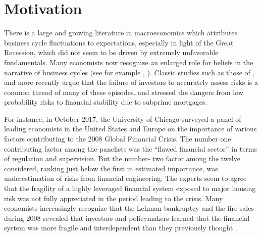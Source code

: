 \documentclass[12pt]{article}
\newcommand{\1}{\mathbbm 1}
\begin{document}
		\vspace{-8ex}
		
		
		
		\tableofcontents
		
		\newpage{}
		
		\vspace{-8ex}
		
		
		
		
		\section{Motivation}
	
		
	
		
		There is a large and growing literature in macroeconomics which attributes business cycle fluctuations to expectations, especially in light of the Great Recession, which did not seem to be driven by extremely unfavorable fundamentals. Many economists now recognize an enlarged role for beliefs in the narrative of business cycles (see for example \cite{veldkamp2019tail}, \cite{gennaioli2020crisis}). Classic studies such as those of \cite{minsky1977financial}, \cite{kindleberger1978manias} and more recently \cite{reinhart2009time} argue that the failure of investors to accurately assess risks is a common thread of many of these episodes. \cite{rajan2006has} and \cite{taleb2007black} stressed the dangers from low probability risks to financial stability due to subprime mortgages.
		
		 For instance, in October 2017, the University of Chicago surveyed
		 a panel of leading economists in the United States and Europe on the importance
		 of various factors contributing to the 2008 Global Financial
		 Crisis. The number one contributing factor among the panelists was the
		 ``flawed financial sector'' in terms of regulation and supervision. But the
		 number- two factor among the twelve considered, ranking just below
		 the first in estimated importance, was underestimation of risks from
		 financial engineering. The experts seem to agree that the fragility of a
		 highly leveraged financial system exposed to major housing risk was
		 not fully appreciated in the period leading to the crisis. Many economists increasingly recognize that the Lehman bankruptcy and the fire sales during 2008 revealed that investors and policymakers learned that the financial system was more fragile and interdependent than they previously thought \cite{gennaioli2020crisis}.
		 
\end{document}
